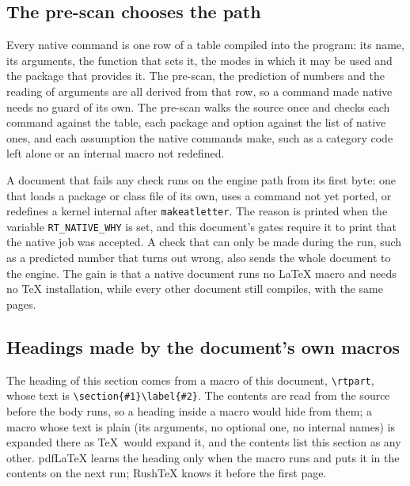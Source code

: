 \documentclass{article}
\numberwithin{equation}{section}
\newcommand{\rtpart}[2]{\section{#1}\label{#2}}
\theoremstyle{definition}
\theoremstyle{remark}
\begin{document}
\subsection{The pre-scan chooses the path}\label{sec:prescan}

Every native command is one row of a table compiled into the program: its name, its
arguments, the function that sets it, the modes in which it may be used and the package
that provides it. The pre-scan, the prediction of numbers and the reading of arguments are
all derived from that row, so a command made native needs no guard of its own. The
pre-scan walks the source once and checks each command against the table, each package
and option against the list of native ones, and each assumption the native commands
make, such as a category code left alone or an internal macro not redefined.

A document that fails any check runs on the engine path from its first byte: one that
loads a package or class file of its own, uses a command not yet ported, or redefines a
kernel internal after \texttt{makeatletter}. The reason is printed when the variable
\texttt{RT\_NATIVE\_WHY} is set, and this document's gates require it to print that the
native job was accepted. A check that can only be made during the run, such as a
predicted number that turns out wrong, also sends the whole document to the engine. The
gain is that a native document runs no \LaTeX{} macro and needs no \TeX{} installation,
while every other document still compiles, with the same pages.

\subsection{Headings made by the document's own macros}\label{sec:headmacros}

The heading of this section comes from a macro of this document, \verb|\rtpart|, whose text is
\verb|\section{#1}\label{#2}|. The contents are read from the source before the body runs,
so a heading inside a macro would hide from them; a macro whose text is plain (its
arguments, no optional one, no internal names) is expanded there as \TeX\ would expand it,
and the contents list this section as any other. pdfLaTeX learns the heading only when
the macro runs and puts it in the contents on the next run; RushTeX knows it before the
first page.
\end{document}
